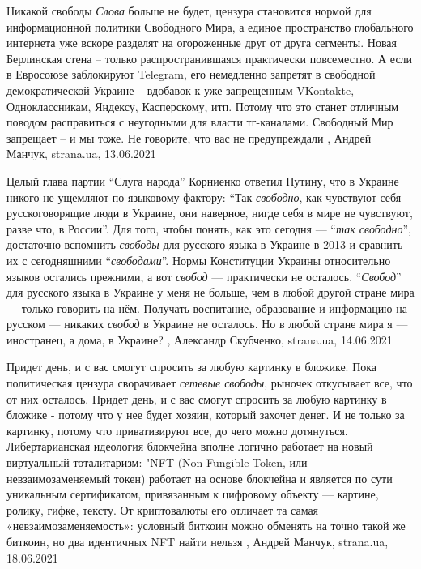 Никакой свободы \emph{Слова} больше не будет, цензура становится нормой для
информационной политики Свободного Мира, а единое пространство глобального
интернета уже вскоре разделят на огороженные друг от друга сегменты. Новая
Берлинская стена – только распространившаяся практически повсеместно. А если в
Евросоюзе заблокируют Telegram, его немедленно запретят в свободной
демократической Украине – вдобавок к уже запрещенным VKontakte, Одноклассникам,
Яндексу, Касперскому, итп. Потому что это станет отличным поводом расправиться
с неугодными для власти тг-каналами. Свободный Мир запрещает – и мы тоже.  Не
говорите, что вас не предупреждали
, Андрей Манчук, strana.ua, 13.06.2021

Целый глава партии \enquote{Слуга народа} Корниенко ответил Путину, что в
Украине никого не ущемляют по языковому фактору: \enquote{Так \emph{свободно},
как чувствуют себя русскоговорящие люди в Украине, они наверное, нигде себя в
мире не чувствуют, разве что, в России}.  Для того, чтобы понять, как это
сегодня — \enquote{\emph{так свободно}}, достаточно вспомнить \emph{свободы}
для русского языка в Украине в 2013 и сравнить их с сегодняшними
\enquote{\emph{свободами}}. Нормы Конституции Украины относительно языков
остались прежними, а вот \emph{свобод} — практически не осталось.
\enquote{\emph{Свобод}} для русского языка в Украине у меня не больше, чем в
любой другой стране мира — только говорить на нём. Получать воспитание,
образование и информацию на русском — никаких \emph{свобод} в Украине не
осталось. Но в любой стране мира я — иностранец, а дома, в Украине?
, 
Александр Скубченко, strana.ua, 14.06.2021

Придет день, и с вас смогут спросить за любую картинку в бложике.  Пока
политическая цензура сворачивает \emph{сетевые свободы}, рыночек откусывает
все, что от них осталось. Придет день, и с вас смогут спросить за любую
картинку в бложике - потому что у нее будет хозяин, который захочет денег. И не
только за картинку, потому что приватизируют все, до чего можно дотянуться.
Либертарианская идеология блокчейна вполне логично работает на новый
виртуальный тоталитаризм: "NFT (Non-Fungible Token, или невзаимозаменяемый
токен) работает на основе блокчейна и является по сути уникальным сертификатом,
привязанным к цифровому объекту — картине, ролику, гифке, тексту. От
криптовалюты его отличает та самая «невзаимозаменяемость»: условный биткоин
можно обменять на точно такой же биткоин, но два идентичных NFT найти нельзя
, 
Андрей Манчук, strana.ua, 18.06.2021


